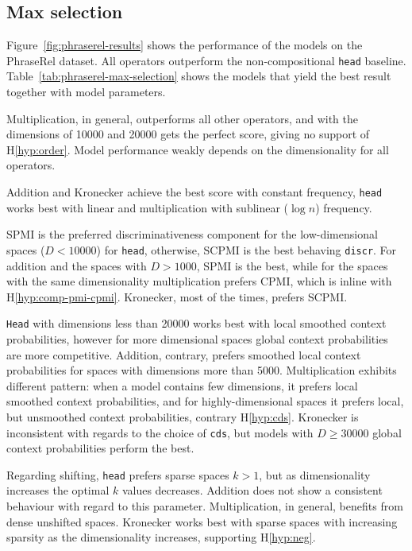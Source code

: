 \subsection{Max selection}
\label{sec:max-selection-phraserel}



Figure~\ref{fig:phraserel-results} shows the performance of the models on the PhraseRel dataset. All operators outperform the non-compositional \texttt{head} baseline. Table~\ref{tab:phraserel-max-selection} shows the models that yield the best result together with model parameters.

Multiplication, in general, outperforms all other operators, and with the dimensions of 10000 and 20000 gets the perfect score, giving no support of H\ref{hyp:order}. Model performance weakly depends on the dimensionality for all operators.

Addition and Kronecker achieve the best score with constant frequency, \texttt{head} works best with linear and multiplication with sublinear ($\log n$) frequency.

SPMI is the preferred discriminativeness component for the low-dimensional spaces ($D < 10000$) for \texttt{head}, otherwise, SCPMI is the best behaving \texttt{discr}. For addition and the spaces with $D > 1000$, SPMI is the best, while for the spaces with the same dimensionality multiplication prefers CPMI, which is inline with H\ref{hyp:comp-pmi-cpmi}. Kronecker, most of the times, prefers SCPMI.

\texttt{Head} with dimensions less than 20000 works best with local smoothed context probabilities, however for more dimensional spaces global context probabilities are more competitive. Addition, contrary, prefers smoothed local context probabilities for spaces with dimensions more than 5000. Multiplication exhibits different pattern: when a model contains few dimensions, it prefers local smoothed context probabilities, and for highly-dimensional spaces it prefers local, but unsmoothed context probabilities, contrary H\ref{hyp:cds}. Kronecker is inconsistent with regards to the choice of \texttt{cds}, but models with $D \geq 30000$ global context probabilities perform the best.

Regarding shifting, \texttt{head} prefers sparse spaces $k > 1$, but as dimensionality increases the optimal $k$ values decreases. Addition does not show a consistent behaviour with regard to this parameter. Multiplication, in general, benefits from dense unshifted spaces. Kronecker works best with sparse spaces with increasing sparsity as the dimensionality increases, supporting H\ref{hyp:neg}.

